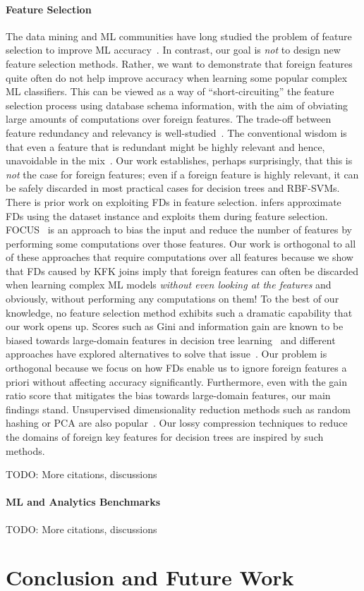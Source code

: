 \documentclass{vldb}
\begin{document}
\paragraph*{Feature Selection}
The data mining and ML communities have long studied the problem of feature selection to improve ML accuracy~\cite{guyonbook,hastie}.
In contrast, our goal is \textit{not} to design new feature selection methods. Rather, we want to demonstrate that foreign features quite often do not help improve 
accuracy when learning some popular complex ML classifiers. This can be viewed as a way of ``short-circuiting'' the feature selection process using database schema 
information, with the aim of obviating large amounts of computations over foreign features.
The trade-off between feature redundancy and relevancy is well-studied~\cite{guyonbook,leiyu,daphnekoller}. The conventional wisdom is that even a feature that is 
redundant might be highly relevant and hence, unavoidable in the mix~\cite{guyonbook}. Our work establishes, perhaps surprisingly, that this is \textit{not} the case 
for foreign features; even if a foreign feature is highly relevant, it can be safely discarded in most practical cases for decision trees and RBF-SVMs.
There is prior work on exploiting FDs in feature selection.
\cite{approxfds} infers approximate FDs using the dataset instance and exploits them during feature selection.
FOCUS~\cite{focus} is an approach to bias the input and reduce the number of features by performing some computations over those features.
Our work is orthogonal to all of these approaches that require computations over all features because we show that FDs caused by KFK joins imply that foreign features 
can often be discarded when learning complex ML models \textit{without even looking at the features} and obviously, without performing any computations on them!
To the best of our knowledge, no feature selection method exhibits such a dramatic capability that our work opens up.
Scores such as Gini and information gain are known to be biased towards large-domain features in decision tree learning~\cite{dtreebias1} and different approaches 
have explored alternatives to solve that issue~\cite{dtreebias2}. Our problem is orthogonal because we focus on how FDs enable us to ignore foreign features a priori 
without affecting accuracy significantly. Furthermore, even with the gain ratio score that mitigates the bias towards large-domain features, our main findings stand.
Unsupervised dimensionality reduction methods such as random hashing or PCA are also popular~\cite{hastie,mitchellbook}. Our lossy compression techniques to 
reduce the domains of foreign key features for decision trees are inspired by such methods.

TODO: More citations, discussions

\paragraph*{ML and Analytics Benchmarks}

TODO: More citations, discussions


\section{Conclusion and Future Work}


\pagebreak



\end{document}
